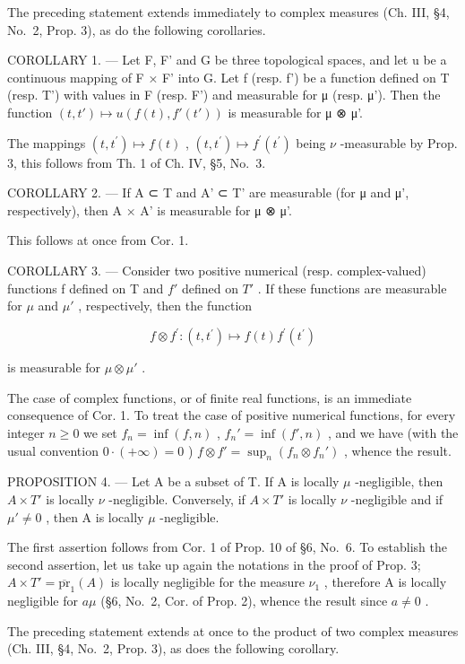 The preceding statement extends immediately to complex measures (Ch. III, §4, No.~2, Prop. 3), as do the following corollaries.

COROLLARY 1. --- Let F, F' and G be three topological spaces, and let u be a continuous mapping of F × F' into G. Let f (resp. f') be a function defined on T (resp. T') with values in F (resp. F') and measurable for μ (resp. μ'). Then the function \((t, t') \mapsto u(f(t), f'(t'))\) is measurable for μ ⊗ μ'.

The mappings \((t,t^{\prime})\mapsto f(t)\) , \((t,t^{\prime})\mapsto f^{\prime}(t^{\prime})\) being \(\nu\) -measurable by Prop. 3, this follows from Th. 1 of Ch. IV, §5, No.~3.

COROLLARY 2. --- If A ⊂ T and A' ⊂ T' are measurable (for μ and μ', respectively), then A × A' is measurable for μ ⊗ μ'.

This follows at once from Cor. 1.

COROLLARY 3. --- Consider two positive numerical (resp. complex-valued) functions f defined on T and \(f'\) defined on \(T'\) . If these functions are measurable for \(\mu\) and \(\mu'\) , respectively, then the function

\[
f \otimes f ^ {\prime}: (t, t ^ {\prime}) \mapsto f (t) f ^ {\prime} (t ^ {\prime})
\]

is measurable for \(\mu \otimes \mu'\) .

The case of complex functions, or of finite real functions, is an immediate consequence of Cor. 1. To treat the case of positive numerical functions, for every integer \(n \geqslant 0\) we set \(f_n = \inf(f, n)\) , \(f_n' = \inf(f', n)\) , and we have (with the usual convention \(0 \cdot (+\infty) = 0\) ) \(f \otimes f' = \sup_n(f_n \otimes f_n')\) , whence the result.

PROPOSITION 4. --- Let A be a subset of T. If A is locally \(\mu\) -negligible, then \(A \times T'\) is locally \(\nu\) -negligible. Conversely, if \(A \times T'\) is locally \(\nu\) -negligible and if \(\mu' \neq 0\) , then A is locally \(\mu\) -negligible.

The first assertion follows from Cor. 1 of Prop. 10 of §6, No.~6. To establish the second assertion, let us take up again the notations in the proof of Prop. 3; \(A \times T' = \overline{\text{pr}}_{1}(A)\) is locally negligible for the measure \(\nu_{1}\) , therefore A is locally negligible for \(a\mu\) (§6, No.~2, Cor. of Prop. 2), whence the result since \(a \neq 0\) .

The preceding statement extends at once to the product of two complex measures (Ch. III, §4, No.~2, Prop. 3), as does the following corollary.

